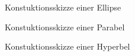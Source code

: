 \begin{figure}[h]
	\centering
		\resizebox{.5\linewidth}{!}{
			
		}
	\caption{Konstuktionsskizze einer Ellipse}
\end{figure}

\begin{figure}[h]
	\centering
		\resizebox{.5\linewidth}{!}{
			
		}
	\caption{Konstuktionsskizze einer Parabel}
\end{figure}

\begin{figure}[h]
	\centering
		\resizebox{.5\linewidth}{!}{
			
		}
	\caption{Konstuktionsskizze einer Hyperbel}
\end{figure}